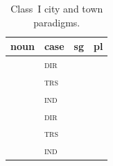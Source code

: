 \begin{table}[ht]
  \footnotesize
  \caption{Class~I city and town paradigms.}
  \ifparadigmappendix\else\label{tab:city-town-paradigms}\fi
  \begin{tabularx}{\textwidth}{l l L L}
    \toprule
    {\sc noun} & {\sc case} & {\sc sg} & {\sc pl} \\
    \midrule
     & \textsc{dir} &  &  \\
     & \textsc{trs} &  &  \\
     & \textsc{ind} &  &  \\
    \addlinespace
     & \textsc{dir} &  &  \\
     & \textsc{trs} &  &  \\
     & \textsc{ind} &  &  \\
    \bottomrule
  \end{tabularx}
\end{table}
